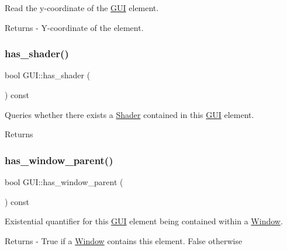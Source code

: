 Read the y-\/coordinate of the \mbox{\hyperlink{class_g_u_i}{G\+UI}} element. \begin{DoxyReturn}{Returns}
-\/ Y-\/coordinate of the element. 
\end{DoxyReturn}
\mbox{\label{class_g_u_i_a3e5c5758569b0a6f7f8a0763ac5f2d56}} 
\subsubsection{\texorpdfstring{has\+\_\+shader()}{has\_shader()}}
{\footnotesize\ttfamily bool G\+U\+I\+::has\+\_\+shader (\begin{DoxyParamCaption}{ }\end{DoxyParamCaption}) const}

Queries whether there exists a \mbox{\hyperlink{class_shader}{Shader}} contained in this \mbox{\hyperlink{class_g_u_i}{G\+UI}} element. \begin{DoxyReturn}{Returns}

\end{DoxyReturn}
\mbox{\label{class_g_u_i_aacd4d5cfd38dbec244929deabf26b010}} 
\subsubsection{\texorpdfstring{has\+\_\+window\+\_\+parent()}{has\_window\_parent()}}
{\footnotesize\ttfamily bool G\+U\+I\+::has\+\_\+window\+\_\+parent (\begin{DoxyParamCaption}{ }\end{DoxyParamCaption}) const}

Existential quantifier for this \mbox{\hyperlink{class_g_u_i}{G\+UI}} element being contained within a \mbox{\hyperlink{class_window}{Window}}. \begin{DoxyReturn}{Returns}
-\/ True if a \mbox{\hyperlink{class_window}{Window}} contains this element. False otherwise 
\end{DoxyReturn}
\mbox{\label{class_g_u_i_a39a7e284ade3ed1cb65c6d22f55a80a2}} 
